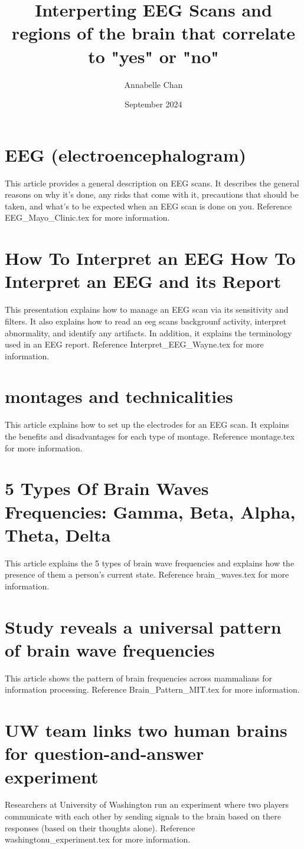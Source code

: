 \documentclass[12pt]{article}
\title{Interperting EEG Scans and regions of the brain that correlate to "yes" or "no"}
\author{Annabelle Chan}
\date{September 2024}
\begin{document}
\maketitle

\section{EEG (electroencephalogram)}
This article provides a general description on EEG scans. It describes the general reasons on why it's done, any risks that come with it, precautions that should be taken, and what's to be expected when an EEG scan is done on you. Reference EEG\_Mayo\_Clinic.tex for more information.

\section{How To Interpret an EEG How To Interpret an EEG and its Report}
This presentation explains how to manage an EEG scan via its sensitivity and filters. It also explains how to read an eeg scans backgrounf activity, interpret abnormality, and identify any artifacts. In addition, it explains the terminology used in an EEG report. Reference Interpret\_EEG\_Wayne.tex for more information.

\section{montages and technicalities}
This article explains how to set up the electrodes for an EEG scan. It explains the benefits and disadvantages for each type of montage. Reference montage.tex for more information.

\section{5 Types Of Brain Waves Frequencies: Gamma, Beta, Alpha, Theta, Delta}
This article explains the 5 types of brain wave frequencies and explains how the presence of them a person's current state. Reference brain\_waves.tex for more information.

\section{Study reveals a universal pattern of brain wave frequencies}
This article shows the pattern of brain frequencies across mammalians for information processing. Reference Brain\_Pattern\_MIT.tex for more information.

\section{UW team links two human brains for question-and-answer experiment}
Researchers at University of Washington run an experiment where two players communicate with each other by sending signals to the brain based on there responses (based on their thoughts alone). Reference washingtonu\_experiment.tex for more information.
\end{document}

